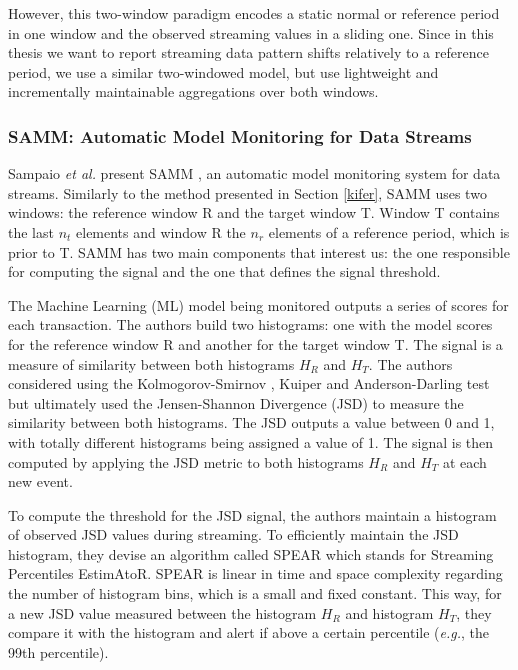 However, this two-window paradigm encodes a static normal or reference period in one window and the observed streaming values in a sliding one. Since in this thesis we want to report streaming data pattern shifts relatively to a reference period, we use a similar two-windowed model, but use lightweight and incrementally maintainable aggregations over both windows.


\subsubsection{SAMM: Automatic Model Monitoring for Data Streams}

Sampaio \emph{et al.} present SAMM \cite{SAMM}, an automatic model monitoring system for data streams. Similarly to the method presented in Section \ref{kifer}, SAMM uses two windows: the reference window R and the target window T. Window T contains the last $n_t$ elements and window R the $n_r$ elements of a reference period, which is prior to T. SAMM has two main components that interest us: the one responsible for computing the signal and the one that defines the signal threshold. 

The Machine Learning (ML) model being monitored outputs a series of scores for each transaction. The authors build two histograms: one with the model scores for the reference window R and another for the target window T. The signal is a measure of similarity between both histograms $H_R$ and $H_T$. The authors considered using the Kolmogorov-Smirnov \cite{KolomogorovSmirnov, Kolmogorov-Smirnov}, Kuiper \cite{KuiperTest} and Anderson-Darling \cite{AndersonDarling} test but ultimately used the Jensen-Shannon Divergence (JSD) \cite{JSD} to measure the similarity between both histograms. The JSD outputs a value between 0 and 1, with totally different histograms being assigned a value of 1. The signal is then computed by applying the JSD metric to both histograms $H_R$ and $H_T$ at each new event.

To compute the threshold for the JSD signal, the authors maintain a histogram of observed JSD values during streaming. To efficiently maintain the JSD histogram, they devise an algorithm called SPEAR which stands for Streaming Percentiles EstimAtoR. SPEAR is linear in time and space complexity regarding the number of histogram bins, which is a small and fixed constant. This way, for a new JSD value measured between the histogram $H_R$ and histogram $H_T$, they compare it with the histogram and alert if above a certain percentile (\textit{e.g.}, the 99th percentile).

